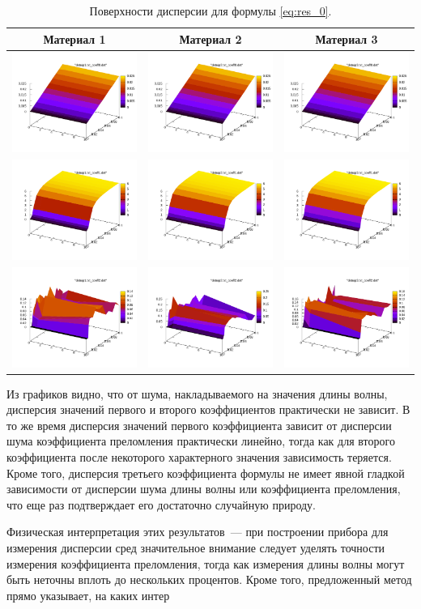 \documentclass[12pt,a4paper]{article}
\begin{document}
\begin{table}[h]
  \centering
  \begin{tabular}{c c c}
	Материал 1 & Материал 2 & Материал 3 \\ \hline
	\includegraphics[scale=0.25]{figs/even/p1.txt_coeff0.dat.pdf} & \includegraphics[scale=0.25]{figs/even/p2.txt_coeff0.dat.pdf} & \includegraphics[scale=0.2]{figs/even/p3.txt_coeff0.dat.pdf} \\
	\includegraphics[scale=0.25]{figs/even/p1.txt_coeff1.dat.pdf} & \includegraphics[scale=0.25]{figs/even/p2.txt_coeff1.dat.pdf} & \includegraphics[scale=0.25]{figs/even/p3.txt_coeff1.dat.pdf} \\
	\includegraphics[scale=0.25]{figs/even/p1.txt_coeff2.dat.pdf} & \includegraphics[scale=0.25]{figs/even/p2.txt_coeff2.dat.pdf} & \includegraphics[scale=0.25]{figs/even/p3.txt_coeff2.dat.pdf}
  \end{tabular}
  \caption{Поверхности дисперсии для формулы \eqref{eq:res_0}.}
  \label{tabl:res_even}
\end{table}

Из графиков видно, что от шума, накладываемого на значения длины волны, дисперсия значений
первого и второго коэффициентов практически не зависит. В то же время дисперсия значений
первого коэффициента зависит от дисперсии шума коэффициента преломления практически линейно,
тогда как для второго коэффициента после некоторого характерного значения зависимость теряется.
Кроме того, дисперсия третьего коэффициента формулы не имеет явной гладкой зависимости от
дисперсии шума длины волны или коэффициента преломления, что еще раз подтверждает его достаточно
случайную природу.

Физическая интерпретация этих результатов~--- при построении прибора для измерения дисперсии
сред значительное внимание следует уделять точности измерения коэффициента преломления,
тогда как измерения длины волны могут быть неточны вплоть до нескольких процентов. Кроме того,
предложенный метод прямо указывает, на каких интер
\end{document}
